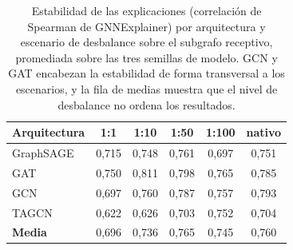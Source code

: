 \begin{table}[htbp]
\centering
\renewcommand{\arraystretch}{1.3}
\begin{tabular}{lccccc}
\toprule
\textbf{Arquitectura} & 1:1 & 1:10 & 1:50 & 1:100 & nativo \\
\midrule
GraphSAGE & 0,715 & 0,748 & 0,761 & 0,697 & 0,751 \\
GAT & 0,750 & 0,811 & 0,798 & 0,765 & 0,785 \\
GCN & 0,697 & 0,760 & 0,787 & 0,757 & 0,793 \\
TAGCN & 0,622 & 0,626 & 0,703 & 0,752 & 0,704 \\
\midrule
\textbf{Media} & 0,696 & 0,736 & 0,765 & 0,745 & 0,760 \\
\bottomrule
\end{tabular}
\caption{Estabilidad de las explicaciones (correlación de Spearman de GNNExplainer) por arquitectura y escenario de desbalance sobre el subgrafo receptivo, promediada sobre las tres semillas de modelo. GCN y GAT encabezan la estabilidad de forma transversal a los escenarios, y la fila de medias muestra que el nivel de desbalance no ordena los resultados.}
\label{tab:elliptic-stab-scen}
\end{table}
